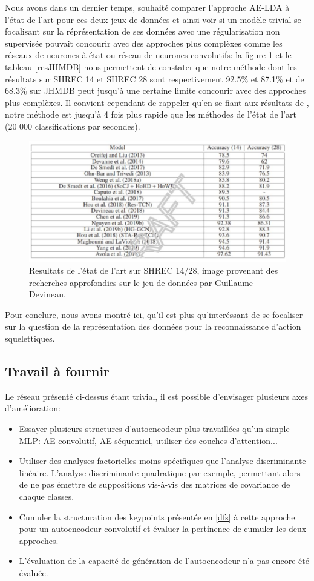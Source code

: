 Nous avons dans un dernier temps, souhaité comparer l'approche AE-LDA à l'état de l'art pour ces deux jeux de données et ainsi voir si un modèle trivial se focalisant sur la réprésentation de ses données avec une régularisation non supervisée pouvait concourir avec des approches plus complèxes comme les réseaux de neurones à état ou réseau de neurones convolutifs: la figure \ref{fig:tabguillaume} et le tableau \ref{resJHMDB} nous permettent de constater que notre méthode dont les résultats sur SHREC 14 et SHREC 28 sont respectivement 92.5\% et 87.1\% et de 68.3\% sur JHMDB peut jusqu'à une certaine limite concourir avec des approches plus complèxes. Il convient cependant de rappeler qu'en se fiant aux résultats de \cite{2019arXiv190709658Y}, notre méthode est jusqu'à 4 fois plus rapide que les méthodes de l'état de l'art (20 000 classifications par secondes).

\begin{figure}[H]
    \centering
    \includegraphics[width=0.8\linewidth]{Images/guillaume_TAB.png}
    \caption{Resultats de l'état de l'art sur SHREC 14/28, image provenant des recherches approfondies sur le jeu de données par Guillaume Devineau. }
    \label{fig:tabguillaume}
\end{figure}\textbf{}

Pour conclure, nous avons montré ici,  qu'il est plus qu'interéssant de se focaliser sur la question de la représentation des données pour la reconnaissance d'action squelettiques. 
\subsection{Travail à fournir}
Le réseau présenté ci-dessus étant trivial, il est possible d'envisager plusieurs axes d'amélioration:

\begin{itemize}
    \item Essayer plusieurs structures d'autoencodeur plus travaillées qu'un simple MLP: AE convolutif, AE séquentiel, utiliser des couches d'attention...
    \item Utiliser des analyses factorielles moins spécifiques que l'analyse discriminante linéaire. L'analyse discriminante quadratique par exemple, permettant alors de ne pas émettre de suppositions vis-à-vis des matrices de covariance de chaque classes. 
    \item Cumuler la structuration des keypoints présentée en \ref{dfs} à cette approche pour un autoencodeur convolutif et évaluer la pertinence de cumuler les deux approches.
    \item L'évaluation de la capacité de génération de l'autoencodeur n'a pas encore été évaluée.
\end{itemize}


